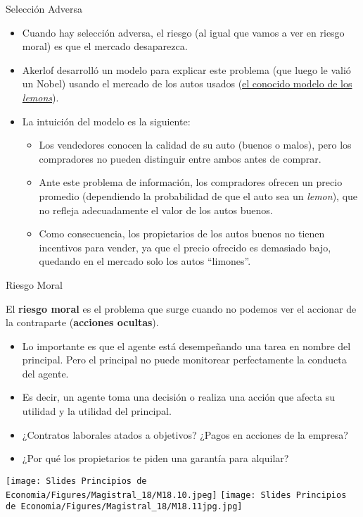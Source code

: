 \documentclass{beamer}
\begin{document}
\begin{frame}{Selección Adversa}
\label{volver}
    \begin{itemize}
        \item Cuando hay selección adversa, el riesgo (al igual que vamos a ver en riesgo moral) es que el mercado desaparezca.
        \vspace{1mm}
        \item Akerlof desarrolló un modelo para explicar este problema (que luego le valió un Nobel) usando el mercado de los autos usados (\hyperlink{hdos}{el conocido modelo de los \textit{lemons}}).
        \vspace{1mm}
        \item La intuición del modelo es la siguiente:
        \begin{itemize}
            \item Los vendedores conocen la calidad de su auto (buenos o malos), pero los compradores no pueden distinguir entre ambos antes de comprar.
            \item Ante este problema de información, los compradores ofrecen un precio promedio (dependiendo la probabilidad de que el auto sea un \textit{lemon}), que no refleja adecuadamente el valor de los autos buenos.
            \item Como consecuencia, los propietarios de los autos buenos no tienen incentivos para vender, ya que el precio ofrecido es demasiado bajo, quedando en el mercado solo los autos “limones”.
        \end{itemize}
    \end{itemize}
\end{frame}

\begin{frame}{Riesgo Moral}
    \begin{boxB}
        \centering
        El \textbf{riesgo moral} es el problema que surge cuando no podemos ver el accionar de la contraparte (\textbf{acciones ocultas}).
    \end{boxB}
    \begin{itemize}
        \item Lo importante es que el agente está desempeñando una tarea en nombre del principal. Pero el principal no puede monitorear perfectamente la conducta del agente.
        \item Es decir, un agente toma una decisión o realiza una acción que afecta su utilidad y la utilidad del principal.
        \item ¿Contratos laborales atados a objetivos? ¿Pagos en acciones de la empresa?
        \item ¿Por qué los propietarios te piden una garantía para alquilar?
    \end{itemize}
    \centering
    \texttt{[image: Slides Principios de Economia/Figures/Magistral\_18/M18.10.jpeg]} \hspace{5mm}
    \texttt{[image: Slides Principios de Economia/Figures/Magistral\_18/M18.11jpg.jpg]}
\end{frame}
\end{document}
